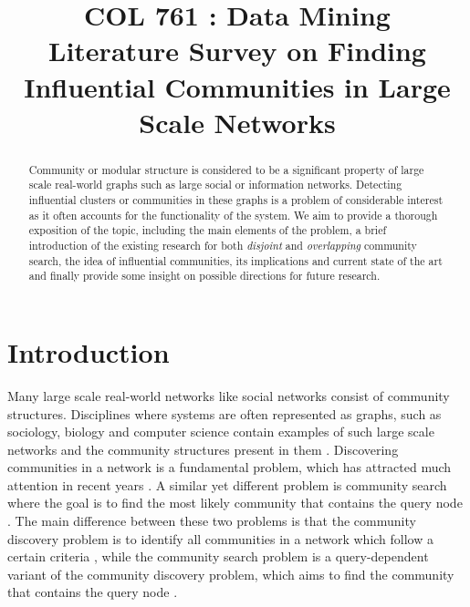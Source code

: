 \documentclass[conference]{IEEEtran}
\begin{document}
\pagestyle{plain}

\title{COL 761 : Data Mining \\ Literature Survey on Finding Influential Communities in Large Scale Networks}

\author{
\and
{}
\and
{}
}

\maketitle

\begin{abstract}

Community or modular structure is considered to be a significant property of large scale real-world graphs such as large social or information networks. Detecting influential clusters or communities in these graphs is a problem of considerable interest as it often accounts for the functionality of the system. We aim to provide a thorough exposition of the topic, including the main elements of the problem, a brief introduction of the existing research for both \textit{disjoint} and \textit{overlapping} community search, the idea of influential communities, its implications and current state of the art and finally provide some insight on possible directions for future research.



\end{abstract}

\section{Introduction}

Many large scale real-world networks like social networks consist of community structures. Disciplines where systems are often represented as graphs, such as sociology, biology and computer science contain examples of such large scale networks and the community structures present in them \cite{Li:2015:ICS:2735479.2735484}. Discovering communities
in a network is a fundamental problem, which has attracted much attention in recent years \cite{FORTUNATO201075, Xie:2013:OCD:2501654.2501657}. A similar yet different problem is community search where the goal is to find the most likely community that contains the query node \cite{Sozio:2010:CPP:1835804.1835923, Cui:2013:OSO:2463676.2463722}. The main difference between these two problems is that the community discovery problem is to identify all communities in a network which follow a certain criteria \cite{FORTUNATO201075}, while the community search problem is a query-dependent variant of the community discovery problem, which aims to find the community that contains the query node \cite{Sozio:2010:CPP:1835804.1835923}.
\end{document}
